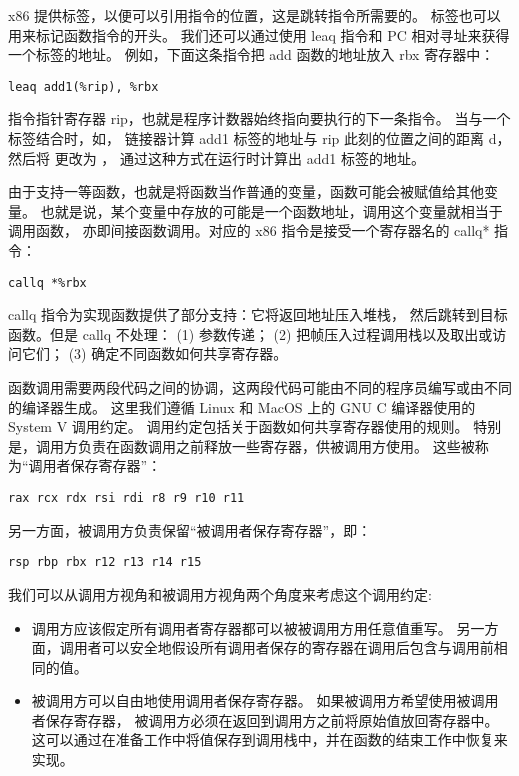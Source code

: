 x86 提供标签，以便可以引用指令的位置，这是跳转指令所需要的。
标签也可以用来标记函数指令的开头。
我们还可以通过使用 leaq 指令和 PC 相对寻址来获得一个标签的地址。
例如，下面这条指令把 add 函数的地址放入 rbx 寄存器中：

\begin{onelinecode}
\begin{lstlisting}
leaq add1(%rip), %rbx
\end{lstlisting}
\end{onelinecode}

指令指针寄存器 rip，也就是程序计数器始终指向要执行的下一条指令。
当与一个标签结合时，如，
链接器计算 add1 标签的地址与 rip 此刻的位置之间的距离 d，
然后将  更改为 ，
通过这种方式在运行时计算出 add1 标签的地址。

由于支持一等函数，也就是将函数当作普通的变量，函数可能会被赋值给其他变量。
也就是说，某个变量中存放的可能是一个函数地址，调用这个变量就相当于调用函数，
亦即间接函数调用。对应的 x86 指令是接受一个寄存器名的 callq* 指令：
\begin{onelinecode}
\begin{lstlisting}
callq *%rbx
\end{lstlisting}
\end{onelinecode}

callq 指令为实现函数提供了部分支持：它将返回地址压入堆栈，
然后跳转到目标函数。但是 callq 不处理：
(1) 参数传递；
(2) 把帧压入过程调用栈以及取出或访问它们；
(3) 确定不同函数如何共享寄存器。


函数调用需要两段代码之间的协调，这两段代码可能由不同的程序员编写或由不同的编译器生成。
这里我们遵循 Linux 和 MacOS 上的 GNU C 编译器使用的
System V 调用约定\cite{Matz_Hubicka_Jaeger_Mitchell_2013}。
调用约定包括关于函数如何共享寄存器使用的规则。
特别是，调用方负责在函数调用之前释放一些寄存器，供被调用方使用。
这些被称为“调用者保存寄存器”：
\begin{onelinecode}
\begin{lstlisting}
rax rcx rdx rsi rdi r8 r9 r10 r11
\end{lstlisting}
\end{onelinecode}
另一方面，被调用方负责保留“被调用者保存寄存器”，即：
\begin{onelinecode}
\begin{lstlisting}
rsp rbp rbx r12 r13 r14 r15
\end{lstlisting}
\end{onelinecode}

我们可以从调用方视角和被调用方视角两个角度来考虑这个调用约定:
\begin{itemize}
\item 调用方应该假定所有调用者寄存器都可以被被调用方用任意值重写。
另一方面，调用者可以安全地假设所有调用者保存的寄存器在调用后包含与调用前相同的值。
\item 被调用方可以自由地使用调用者保存寄存器。
如果被调用方希望使用被调用者保存寄存器，
被调用方必须在返回到调用方之前将原始值放回寄存器中。
这可以通过在准备工作中将值保存到调用栈中，并在函数的结束工作中恢复来实现。
\end{itemize}

